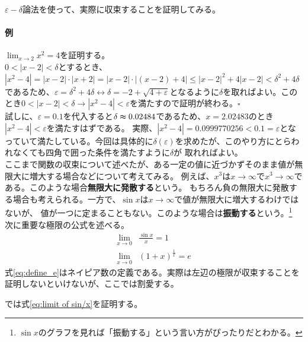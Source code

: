 \documentclass[a4j,dvipdfmx]{jsarticle}
\begin{document}
                $\varepsilon-\delta$論法を使って、実際に収束することを証明してみる。
                \paragraph*{例}$\displaystyle\lim_{x\to 2}x^2=4$を証明する。\\
                $0<|x-2|<\delta$とするとき、$|x^2-4|=|x-2|\cdot|x+2|=|x-2|\cdot|(x-2)+4|\leq |x-2|^2+4|x-2|<\delta^2+4\delta$
                であるため、$\varepsilon=\delta^2+4\delta\leftrightarrow \delta = -2+\sqrt{4+\varepsilon}$となるように$\delta$を取ればよい。このとき$0<|x-2|<\delta\rightarrow|x^2-4|<\varepsilon$を満たすので証明が終わる。$\square$\\

                試しに、$\varepsilon = 0.1$を代入すると$\delta \thickapprox 0.02484$であるため、$x=2.02483$のとき$|x^2-4|<\varepsilon$を満たすはずである。
                実際、$|x^2-4|=0.0999770256<0.1=\varepsilon$となっていて満たしている。今回は具体的に$\delta(\varepsilon)$を求めたが、このやり方にとらわれなくても四角で囲った条件を満たすように$\delta$が
                取れればよい。\\

                ここまで関数の収束について述べたが、ある一定の値に近づかずそのまま値が無限大に増大する場合などについて考えてみる。
                例えば、$x^3$は$x\to\infty$で$x^3\to\infty$である。このような場合\textbf{無限大に発散する}という。
                もちろん負の無限大に発散する場合も考えられる。一方で、$\sin x$は$x\to\infty$で値が無限大に増大するわけではないが、
                値が一つに定まることもない。このような場合は\textbf{振動する}という。\footnote{$\sin x$のグラフを見れば「振動する」という言い方がぴったりだとわかる。}\\

                次に重要な極限の公式を述べる。
                \begin{align}
                    \lim_{x\to 0}&\frac{\sin x}{x}=1\label{eq:limit of sin/x}\\
                    \lim_{x\to 0}&\left(1+x\right)^\frac{1}{x} = e\label{eq:define_e}
                \end{align}
                式\eqref{eq:define_e}はネイピア数の定義である。実際は左辺の極限が収束することを証明しないといけないが、ここでは割愛する。

                では式\eqref{eq:limit of sin/x}を証明する。
\end{document}
